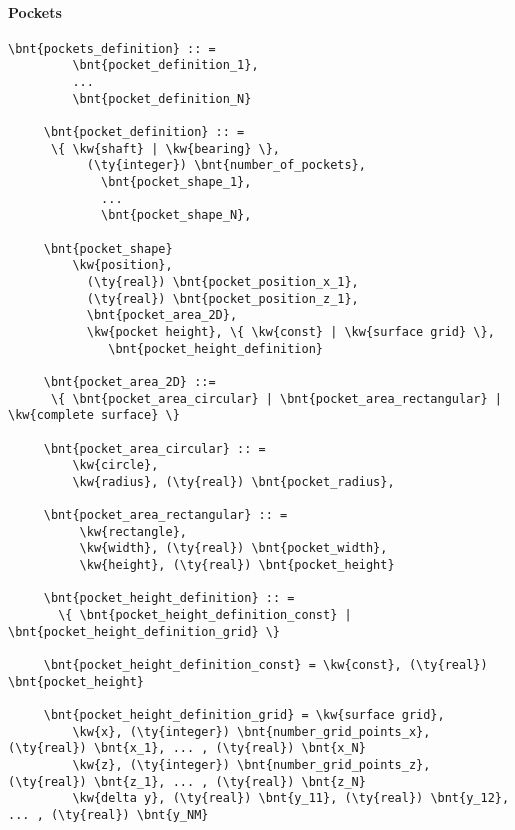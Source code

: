 \paragraph{Pockets}
\begin{Verbatim}[commandchars=\\\{\}]
     \bnt{pockets_definition} :: =
         \bnt{pocket_definition_1},
         ...
         \bnt{pocket_definition_N}

     \bnt{pocket_definition} :: =
      \{ \kw{shaft} | \kw{bearing} \},
           (\ty{integer}) \bnt{number_of_pockets},
             \bnt{pocket_shape_1},
             ...
             \bnt{pocket_shape_N},

     \bnt{pocket_shape}
         \kw{position},
           (\ty{real}) \bnt{pocket_position_x_1},
           (\ty{real}) \bnt{pocket_position_z_1},
           \bnt{pocket_area_2D},
           \kw{pocket height}, \{ \kw{const} | \kw{surface grid} \},
              \bnt{pocket_height_definition}

     \bnt{pocket_area_2D} ::=
      \{ \bnt{pocket_area_circular} | \bnt{pocket_area_rectangular} | \kw{complete surface} \}

     \bnt{pocket_area_circular} :: =
         \kw{circle},
         \kw{radius}, (\ty{real}) \bnt{pocket_radius},

     \bnt{pocket_area_rectangular} :: =
          \kw{rectangle},
          \kw{width}, (\ty{real}) \bnt{pocket_width},
          \kw{height}, (\ty{real}) \bnt{pocket_height}

     \bnt{pocket_height_definition} :: =
       \{ \bnt{pocket_height_definition_const} | \bnt{pocket_height_definition_grid} \}

     \bnt{pocket_height_definition_const} = \kw{const}, (\ty{real}) \bnt{pocket_height}

     \bnt{pocket_height_definition_grid} = \kw{surface grid},
         \kw{x}, (\ty{integer}) \bnt{number_grid_points_x}, (\ty{real}) \bnt{x_1}, ... , (\ty{real}) \bnt{x_N}
         \kw{z}, (\ty{integer}) \bnt{number_grid_points_z}, (\ty{real}) \bnt{z_1}, ... , (\ty{real}) \bnt{z_N}
         \kw{delta y}, (\ty{real}) \bnt{y_11}, (\ty{real}) \bnt{y_12}, ... , (\ty{real}) \bnt{y_NM}

\end{Verbatim}
